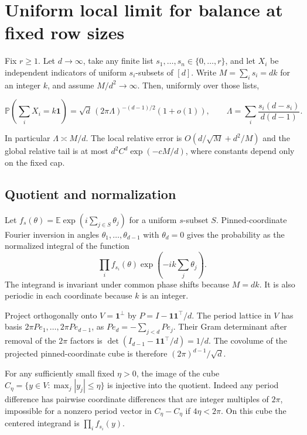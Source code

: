 \section{Uniform local limit for balance at fixed row sizes}\label{sec:profiles}

Fix $r\ge1$. Let $d\to\infty$, take any finite list $s_1,\ldots,s_n\in\{0,\ldots,r\}$, and let $X_i$ be independent indicators of uniform $s_i$-subsets of $[d]$. Write $M=\sum_i s_i=dk$ for an integer $k$, and assume $M/d^2\to\infty$. Then, uniformly over those lists,

\begin{equation*}
\mathbb P\!\left(\sum_i X_i=k\mathbf 1\right)
=\sqrt d\,(2\pi\Lambda)^{-(d-1)/2}(1+o(1)),
\qquad
\Lambda=\sum_i\frac{s_i(d-s_i)}{d(d-1)}.
\end{equation*}

In particular $\Lambda\asymp M/d$. The local relative error is $O(d/\sqrt M+d^2/M)$ and the global relative tail is at most $d^2 C^d\exp(-c M/d)$, where constants depend only on the fixed cap.

\subsection{Quotient and normalization}

Let $f_s(\theta)=\mathbb E\exp(i\sum_{j\in S}\theta_j)$ for a uniform $s$-subset $S$. Pinned-coordinate Fourier inversion in angles $\theta_1,\ldots,\theta_{d-1}$ with $\theta_d=0$ gives the probability as the normalized integral of the function
\[\prod_i f_{s_i}(\theta)\exp(-ik\sum_j\theta_j).\]
The integrand is invariant under common phase shifts because $M=dk$. It is also periodic in each coordinate because $k$ is an integer.

Project orthogonally onto $V=\mathbf 1^\perp$ by $P=I-\mathbf 1\mathbf 1^\top/d$. The period lattice in $V$ has basis $2\pi Pe_1,\ldots,2\pi Pe_{d-1}$, as $Pe_d=-\sum_{j<d}Pe_j$. Their Gram determinant after removal of the $2\pi$ factors is $\det(I_{d-1}-\mathbf 1\mathbf 1^\top/d)=1/d$. The covolume of the projected pinned-coordinate cube is therefore $(2\pi)^{d-1}/\sqrt d$.

For any sufficiently small fixed $\eta>0$, the image of the cube $C_\eta=\{y\in V:\max_j|y_j|\le\eta\}$ is injective into the quotient. Indeed any period difference has pairwise coordinate differences that are integer multiples of $2\pi$, impossible for a nonzero period vector in $C_\eta-C_\eta$ if $4\eta<2\pi$. On this cube the centered integrand is $\prod_i f_{s_i}(y)$.

